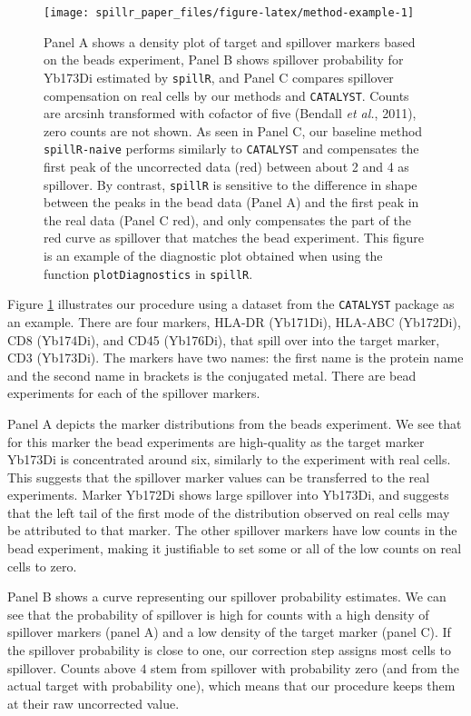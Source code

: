 \documentclass{bioinfo}
\begin{document}
\begin{figure}

{\centering \texttt{[image: spillr\_paper\_files/figure-latex/method-example-1]} 

}

\caption{Panel A shows a density plot of target and spillover markers based on the beads experiment, Panel B shows spillover probability for Yb173Di estimated by \texttt{spillR}, and Panel C compares spillover compensation on real cells by our methods and \texttt{CATALYST}. Counts are arcsinh transformed with cofactor of five (Bendall \emph{et al.}, 2011), zero counts are not shown. As seen in Panel C, our baseline method \texttt{spillR-naive} performs similarly to \texttt{CATALYST} and compensates the first peak of the uncorrected data (red) between about 2 and 4 as spillover. By contrast, \texttt{spillR} is sensitive to the difference in shape between the peaks in the bead data (Panel A) and the first peak in the real data (Panel C red), and only compensates the part of the red curve as spillover that matches the bead experiment. This figure is an example of the diagnostic plot obtained when using the function \texttt{plotDiagnostics} in \texttt{spillR}.}\label{fig:method-example}
\end{figure}

Figure \ref{fig:method-example} illustrates our procedure using a
dataset from the \texttt{CATALYST} package as an example. There are four
markers, HLA-DR (Yb171Di), HLA-ABC (Yb172Di), CD8 (Yb174Di), and CD45
(Yb176Di), that spill over into the target marker, CD3 (Yb173Di). The
markers have two names: the first name is the protein name and the
second name in brackets is the conjugated metal. There are bead
experiments for each of the spillover markers.

Panel A depicts the marker distributions from the beads experiment. We
see that for this marker the bead experiments are high-quality as the
target marker Yb173Di is concentrated around six, similarly to the
experiment with real cells. This suggests that the spillover marker
values can be transferred to the real experiments. Marker Yb172Di shows
large spillover into Yb173Di, and suggests that the left tail of the
first mode of the distribution observed on real cells may be attributed
to that marker. The other spillover markers have low counts in the bead
experiment, making it justifiable to set some or all of the low counts
on real cells to zero.

Panel B shows a curve representing our spillover probability estimates.
We can see that the probability of spillover is high for counts with a
high density of spillover markers (panel A) and a low density of the
target marker (panel C). If the spillover probability is close to one,
our correction step assigns most cells to spillover. Counts above \(4\)
stem from spillover with probability zero (and from the actual target
with probability one), which means that our procedure keeps them at
their raw uncorrected value.
\end{document}
